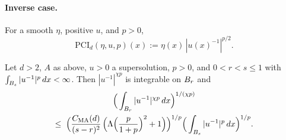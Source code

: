 \paragraph{Inverse case.}

\begin{definition}
\label{def:superPowerCutoff}
\leanok
For a smooth $\eta$, positive $u$, and $p > 0$,
\begin{equation*}
  \mathrm{PCI}_d(\eta,u,p)(x) := \eta(x)\,|u(x)^{-1}|^{p/2}.
\end{equation*}
\end{definition}

\begin{theorem}
\label{thm:preMoser-inv}
\leanok
{}
Let $d>2$, $A$ as above, $u > 0$ a supersolution, $p > 0$, and
$0 < r < s \leq 1$ with $\int_{B_{s}} |u^{-1}|^{p}\,dx < \infty$. Then
$|u^{-1}|^{\chi p}$ is integrable on $B_{r}$ and
\begin{multline*}
  \Big(\int_{B_{r}} |u^{-1}|^{\chi p}\,dx\Big)^{1/(\chi p)}
  \\ \leq\;
  \Big(\frac{C_{\mathrm{MA}}(d)}{(s-r)^{2}}\,
    \Big(\Lambda\Big(\frac{p}{1+p}\Big)^{2}+1\Big)\Big)^{1/p}
  \Big(\int_{B_{s}} |u^{-1}|^{p}\,dx\Big)^{1/p}.
\end{multline*}
\end{theorem}

